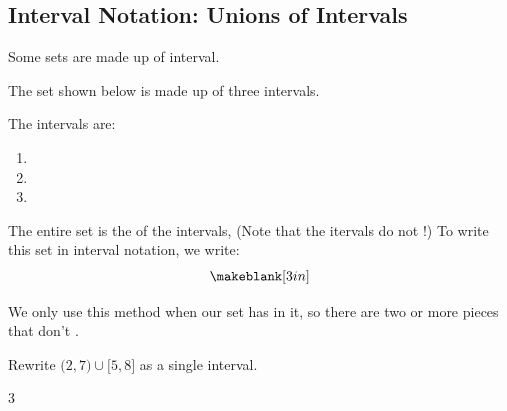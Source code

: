 \subsection{Interval Notation: Unions of Intervals} 
Some sets are made up of \makeblank interval.
\begin{Example} The set shown below is made up of three intervals.
\begin{icpic}
\end{icpic}
The intervals are:
\begin{enumerate}
\item \makeblank
\item \makeblank
\item \makeblank
\end{enumerate}
The entire set is the \makeblank[1in] of the intervals, (Note that the itervals do not {\makeblank}!) To write this set in interval notation, we write:
\[
\makeblank[3in]
\]
\end{Example}
\begin{Note} We only use this method when our set has \makeblank[1in] in it, so there are two or more pieces that don't \makeblank.
\end{Note}
\begin{Example}
Rewrite $\bigl(2,7\bigr)\cup\bigl[5,8\bigr]$ as a single interval.
\begin{cpic}{}{3}
\end{cpic}
\end{Example}